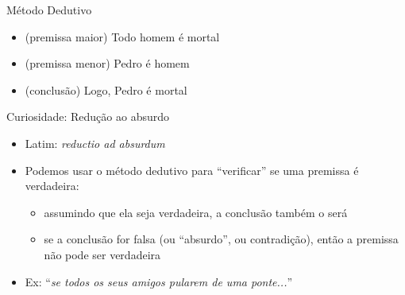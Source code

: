 \documentclass{beamer}
\begin{document}
\begin{frame}{Método Dedutivo}
  \begin{example}
    \begin{itemize}
    \item (premissa maior) Todo homem é mortal
    \item (premissa menor) Pedro é homem
    \item (conclusão) Logo, Pedro é mortal
    \end{itemize}
  \end{example}
\end{frame}

\begin{frame}{Curiosidade: Redução ao absurdo}
  \begin{itemize}
  \item Latim: {\em reductio ad absurdum}
  \item Podemos usar o método dedutivo para ``verificar'' se uma
    premissa é verdadeira:
    \begin{itemize}
    \item \alert{assumindo que ela seja verdadeira}, a conclusão também o será
    \item se a conclusão for falsa (ou ``absurdo'', ou contradição),
      então a premissa não pode ser verdadeira
    \end{itemize}
  \item Ex: ``{\em se todos os seus amigos pularem de uma ponte...}''
  \end{itemize}
\end{frame}



\end{document}
